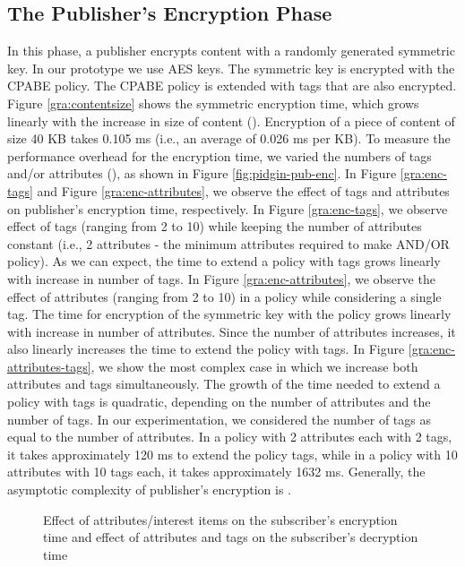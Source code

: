 \documentclass[epsfig,a4paper,11pt,titlepage]{book}
\numberwithin{algorithm}{chapter}
\begin{document}
\subsection{The Publisher's Encryption Phase}
In this phase, a publisher encrypts content with a randomly generated symmetric key. In our prototype we use \gls{AES} keys. 
The symmetric key is encrypted with the \gls{CPABE} policy. The \gls{CPABE} policy is extended with tags that are also encrypted. 
Figure \ref{gra:contentsize} shows the symmetric encryption time, which grows linearly with the increase in size of content (). Encryption of a piece of content of size 40 \gls{KB} takes 0.105 \gls{ms} (i.e., an average of 0.026 \gls{ms} per \gls{KB}). To measure the performance overhead for the encryption time, we varied the numbers of tags and/or attributes (), as shown in Figure \ref{fig:pidgin-pub-enc}. In Figure \ref{gra:enc-tags} and Figure \ref{gra:enc-attributes}, we observe the effect of tags and attributes on publisher's encryption time, respectively. In Figure \ref{gra:enc-tags}, we observe effect of tags (ranging from 2 to 10) while keeping the number of attributes constant (i.e., 2 attributes - the minimum attributes required to make AND/OR policy). As we can expect, the time to extend a policy with tags grows linearly with increase in number of tags. In Figure \ref{gra:enc-attributes}, we observe the effect of attributes (ranging from 2 to 10) in a policy while considering a single tag. The time for encryption of the symmetric key with the policy grows linearly with increase in number of attributes. Since the number of attributes increases, it also linearly increases the time to extend the policy with tags. In Figure \ref{gra:enc-attributes-tags}, we show the most complex case in which we increase both attributes and tags simultaneously. The growth of the time needed to extend a policy with tags is quadratic, depending on the number of attributes and the number of tags. In our experimentation, we considered the number of tags as equal to the number of attributes. In a policy with 2 attributes each with 2 tags, it takes approximately 120 \gls{ms} to extend the policy tags, while in a policy with 10 attributes with 10 tags each, it takes approximately 1632 \gls{ms}. Generally, the asymptotic complexity of publisher's encryption is . 

\begin{figure}
\centering


\caption[Effect of attributes/items on the subscriber's encryption/decryption time]{Effect of  attributes/interest items on the subscriber's encryption time and effect of  attributes and  tags on the subscriber's decryption time}
\label{fig:pidgin-sub-enc-dec}
\end{figure}
\end{document}

